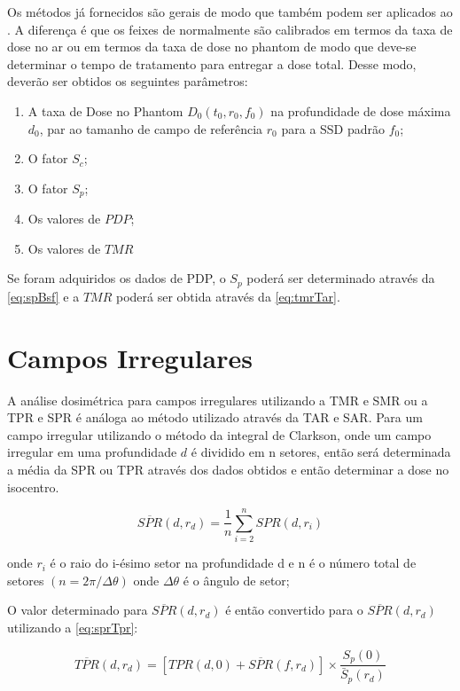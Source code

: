 \documentclass[11pt,a4paper]{article}
\begin{document}
        Os métodos já fornecidos são gerais de modo que também podem ser aplicados ao . A diferença é que os feixes de  normalmente são calibrados em termos da taxa de dose no ar ou em termos da taxa de dose no phantom de modo que deve-se determinar o tempo de tratamento para entregar a dose total. Desse modo, deverão ser obtidos os seguintes parâmetros:

        \begin{enumerate}[label=\textcolor{CarnationPink}{(\alph*)}]
            \item A taxa de Dose no Phantom $D_0(t_0, r_0, f_0)$ na profundidade de dose máxima $d_0$, par ao tamanho de campo de referência $r_0$ para a SSD padrão $f_0$;
            \item O fator $S_c$;
            \item O fator $S_p$;
            \item Os valores de $PDP$;
            \item Os valores de $TMR$
        \end{enumerate}

        Se foram adquiridos os dados de PDP, o $S_p$ poderá ser determinado através da \ref{eq:spBsf} e a $TMR$ poderá ser obtida através da \ref{eq:tmrTar}.


    \section{Campos Irregulares}

        A análise dosimétrica para campos irregulares utilizando a TMR e SMR ou a TPR e SPR é análoga ao método utilizado através da TAR e SAR.  Para um campo irregular utilizando o método da integral de Clarkson, onde um campo irregular em uma profundidade $d$ é dividido em n setores, então será determinada a média da SPR ou TPR através dos dados obtidos e então determinar a dose no isocentro.

        $$\overline{SPR}(d, r_d) = \frac{1}{n} \sum_{i = 2}^{n} SPR(d, r_i)$$


        onde $r_i$ é o raio do i-ésimo setor na profundidade d e n é o número total de setores $(n = 2\pi/\Delta \theta)$ onde $\Delta\theta$  é o ângulo de setor;

        O valor determinado para $\overline{SPR}(d, r_d)$ é então convertido para o $\overline{SPR}(d, r_d)$ utilizando a \ref{eq:sprTpr}:


        $$\overline{TPR}(d, r_d) = \left[TPR(d,0) +\overline{SPR}(f, r_d)\right]\times \frac{S_p(0)}{\bar{S}_p(r_d)}$$
\end{document}
